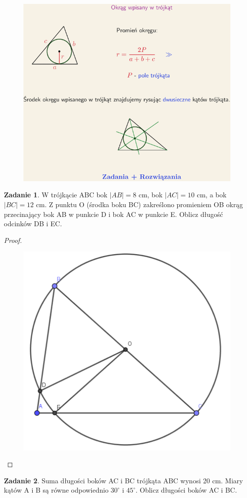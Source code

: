 \documentclass[11pt]{article}
\theoremstyle{definition}
\newtheorem{zad}{Zadanie}
\numberwithin{zad}{section}
\begin{document}
\begin{figure}[H]
\centering
\includegraphics[width=0.8\linewidth]{circle2.png}
\end{figure}

\begin{zad}
W trójkącie ABC bok $|AB| = 8$ cm, bok $|AC| = 10$ cm, a bok $|BC| = 12$ cm. Z punktu O (środka boku BC) zakreślono promieniem OB okrąg przecinający bok AB w punkcie D i bok AC w punkcie E. Oblicz długość odcinków DB i EC.
\end{zad}

\begin{proof}
\begin{figure}[H]
\centering
\includegraphics[width=0.5\linewidth]{circle_triangle.png}
\end{figure}
\end{proof}

\begin{zad}
Suma długości boków AC i BC trójkąta ABC wynosi 20 cm. Miary kątów A i B są równe odpowiednio $30^\circ$ i $45^\circ$. Oblicz długości boków AC i BC.
\end{zad}
\end{document}
